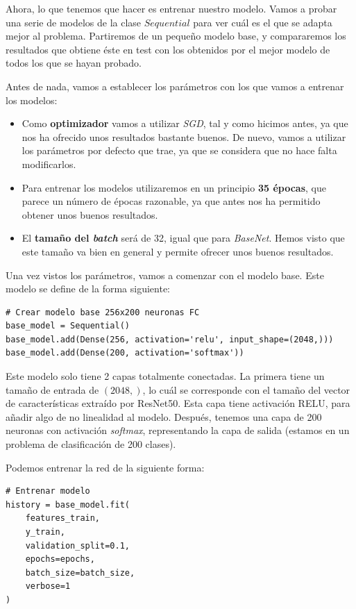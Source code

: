 \documentclass[11pt,a4paper]{article}
\begin{document}
Ahora, lo que tenemos que hacer es entrenar nuestro modelo. Vamos a probar una serie de modelos
de la clase $Sequential$ para ver cuál es el que se adapta mejor al problema. Partiremos de un
pequeño modelo base, y compararemos los resultados que obtiene éste en test con los obtenidos por
el mejor modelo de todos los que se hayan probado.

Antes de nada, vamos a establecer los parámetros con los que vamos a entrenar los modelos:

\begin{itemize}
  \item Como \textbf{optimizador} vamos a utilizar \textit{SGD}, tal y como hicimos antes, ya que
  nos ha ofrecido unos resultados bastante buenos. De nuevo, vamos a utilizar los parámetros por defecto
  que trae, ya que se considera que no hace falta modificarlos.
  \item Para entrenar los modelos utilizaremos en un principio \textbf{35 épocas}, que parece un número
  de épocas razonable, ya que antes nos ha permitido obtener unos buenos resultados.
  \item El \textbf{tamaño del \textit{batch}} será de 32, igual que para \textit{BaseNet}. Hemos visto que
  este tamaño va bien en general y permite ofrecer unos buenos resultados.
\end{itemize}

Una vez vistos los parámetros, vamos a comenzar con el modelo base. Este modelo se define de la forma siguiente:

\begin{lstlisting}
# Crear modelo base 256x200 neuronas FC
base_model = Sequential()
base_model.add(Dense(256, activation='relu', input_shape=(2048,)))
base_model.add(Dense(200, activation='softmax'))
\end{lstlisting}

Este modelo solo tiene 2 capas totalmente conectadas. La primera tiene un tamaño de entrada de $(2048,)$,
lo cuál se corresponde con el tamaño del vector de características extraído por ResNet50. Esta capa tiene
activación RELU, para añadir algo de no linealidad al modelo. Después, tenemos una capa de 200 neuronas con
activación \textit{softmax}, representando la capa de salida (estamos en un problema de clasificación de
200 clases).

Podemos entrenar la red de la siguiente forma:

\begin{lstlisting}
# Entrenar modelo
history = base_model.fit(
    features_train,
    y_train,
    validation_split=0.1,
    epochs=epochs,
    batch_size=batch_size,
    verbose=1
)
\end{lstlisting}
\end{document}
